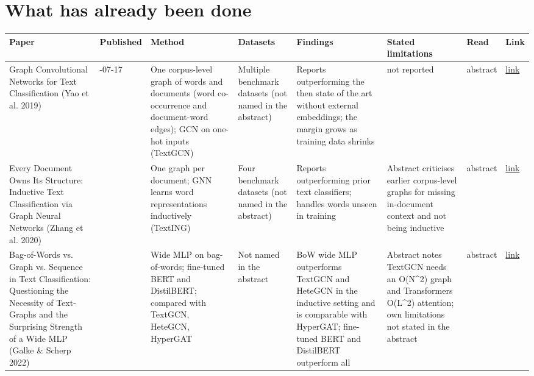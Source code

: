 \documentclass[11pt,a4paper]{article}
\begin{document}
\section{What has already been done}

{\small
\begin{longtable}{>{\raggedright\arraybackslash}p{}>{\raggedright\arraybackslash}p{}>{\raggedright\arraybackslash}p{}>{\raggedright\arraybackslash}p{}>{\raggedright\arraybackslash}p{}>{\raggedright\arraybackslash}p{}>{\raggedright\arraybackslash}p{}>{\raggedright\arraybackslash}p{}}
\toprule
\textbf{Paper} & \textbf{Published} & \textbf{Method} & \textbf{Datasets} & \textbf{Findings} & \textbf{Stated limitations} & \textbf{Read} & \textbf{Link} \\
\midrule
\endhead
Graph Convolutional Networks for Text Classification (Yao et al. 2019) & 2019-07-17 & One corpus-level graph of words and documents (word co-occurrence and document-word edges); GCN on one-hot inputs (TextGCN) & Multiple benchmark datasets (not named in the abstract) & Reports outperforming the then state of the art without external embeddings; the margin grows as training data shrinks & not reported & abstract & \href{https://doi.org/10.1609/aaai.v33i01.33017370}{link} \\
Every Document Owns Its Structure: Inductive Text Classification via Graph Neural Networks (Zhang et al. 2020) & 2020 & One graph per document; GNN learns word representations inductively (TextING) & Four benchmark datasets (not named in the abstract) & Reports outperforming prior text classifiers; handles words unseen in training & Abstract criticises earlier corpus-level graphs for missing in-document context and not being inductive & abstract & \href{https://doi.org/10.18653/v1/2020.acl-main.31}{link} \\
Bag-of-Words vs. Graph vs. Sequence in Text Classification: Questioning the Necessity of Text-Graphs and the Surprising Strength of a Wide MLP (Galke \& Scherp 2022) & 2022 & Wide MLP on bag-of-words; fine-tuned BERT and DistilBERT; compared with TextGCN, HeteGCN, HyperGAT & Not named in the abstract & BoW wide MLP outperforms TextGCN and HeteGCN in the inductive setting and is comparable with HyperGAT; fine-tuned BERT and DistilBERT outperform all & Abstract notes TextGCN needs an O(N\textasciicircum{}2) graph and Transformers O(L\textasciicircum{}2) attention; own limitations not stated in the abstract & abstract & \href{https://doi.org/10.18653/v1/2022.acl-long.279}{link} \\

\end{longtable}}
\end{document}
